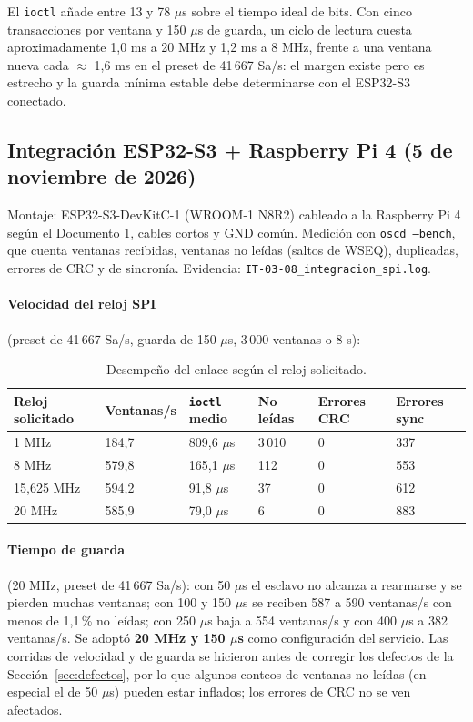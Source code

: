 \documentclass[12pt,a4paper]{article}
\begin{document}
El \texttt{ioctl} añade entre 13 y 78 $\mu$s sobre el tiempo ideal de bits. Con cinco transacciones por ventana y 150 $\mu$s de guarda, un ciclo de lectura cuesta aproximadamente 1{,}0 ms a 20 MHz y 1{,}2 ms a 8 MHz, frente a una ventana nueva cada $\approx$ 1{,}6 ms en el preset de 41\,667 Sa/s: el margen existe pero es estrecho y la guarda mínima estable debe determinarse con el ESP32-S3 conectado.

\subsection{Integración ESP32-S3 + Raspberry Pi 4 (5 de noviembre de 2026)}

Montaje: ESP32-S3-DevKitC-1 (WROOM-1 N8R2) cableado a la Raspberry Pi 4 según el Documento 1, cables cortos y GND común. Medición con \texttt{oscd --bench}, que cuenta ventanas recibidas, ventanas no leídas (saltos de WSEQ), duplicadas, errores de CRC y de sincronía. Evidencia: \texttt{IT-03-08\_integracion\_spi.log}.

\paragraph{Velocidad del reloj SPI} (preset de 41\,667 Sa/s, guarda de 150 $\mu$s, 3\,000 ventanas o 8 s):

\begin{table}[H]
\centering
\small
\begin{tabular}{@{}p{2.6cm} p{2.4cm} p{2.6cm} p{2.2cm} p{2.0cm} p{2.2cm}@{}}
\toprule
\textbf{Reloj solicitado} & \textbf{Ventanas/s} & \textbf{\texttt{ioctl} medio} & \textbf{No leídas} & \textbf{Errores CRC} & \textbf{Errores sync} \\
\midrule
1 MHz        & 184{,}7 & 809{,}6 $\mu$s & 3\,010 & 0 & 337 \\
8 MHz        & 579{,}8 & 165{,}1 $\mu$s & 112    & 0 & 553 \\
15{,}625 MHz & 594{,}2 & 91{,}8 $\mu$s  & 37     & 0 & 612 \\
20 MHz       & 585{,}9 & 79{,}0 $\mu$s  & 6      & 0 & 883 \\
\bottomrule
\end{tabular}
\caption{Desempeño del enlace según el reloj solicitado.}
\end{table}

\paragraph{Tiempo de guarda} (20 MHz, preset de 41\,667 Sa/s): con 50 $\mu$s el esclavo no alcanza a rearmarse y se pierden muchas ventanas; con 100 y 150 $\mu$s se reciben 587 a 590 ventanas/s con menos de 1{,}1\,\% no leídas; con 250 $\mu$s baja a 554 ventanas/s y con 400 $\mu$s a 382 ventanas/s. Se adoptó \textbf{20 MHz y 150 $\mu$s} como configuración del servicio. Las corridas de velocidad y de guarda se hicieron antes de corregir los defectos de la Sección~\ref{sec:defectos}, por lo que algunos conteos de ventanas no leídas (en especial el de 50 $\mu$s) pueden estar inflados; los errores de CRC no se ven afectados.
\end{document}
